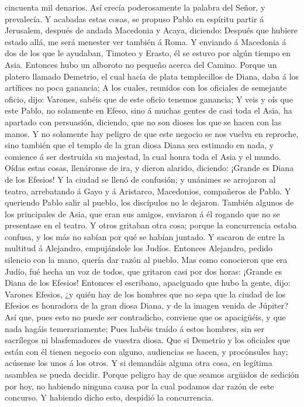 cincuenta mil denarios.  Así crecía poderosamente la
palabra del Señor, y prevalecía.  Y acabadas estas cosas,
se propuso Pablo en espíritu partir á Jerusalem, después de andada
Macedonia y Acaya, diciendo: Después que hubiere estado allá, me será
menester ver también á Roma.  Y enviando á Macedonia á dos
de los que le ayudaban, Timoteo y Erasto, él se estuvo por algún tiempo
en Asia.  Entonces hubo un alboroto no pequeño acerca del
Camino.  Porque un platero llamado Demetrio, el cual hacía
de plata templecillos de Diana, daba á los artífices no poca ganancia;
 A los cuales, reunidos con los oficiales de semejante
oficio, dijo: Varones, sabéis que de este oficio tenemos ganancia;
 Y veis y oís que este Pablo, no solamente en Efeso, sino á
muchas gentes de casi toda el Asia, ha apartado con persuasión,
diciendo, que no son dioses los que se hacen con las manos.
 Y no solamente hay peligro de que este negocio se nos
vuelva en reproche, sino también que el templo de la gran diosa Diana
sea estimado en nada, y comience á ser destruída su majestad, la cual
honra toda el Asia y el mundo.  Oídas estas cosas,
llenáronse de ira, y dieron alarido, diciendo: ¡Grande es Diana de los
Efesios!  Y la ciudad se llenó de confusión; y unánimes se
arrojaron al teatro, arrebatando á Gayo y á Aristarco, Macedonios,
compañeros de Pablo.  Y queriendo Pablo salir al pueblo,
los discípulos no le dejaron.  También algunos de los
principales de Asia, que eran sus amigos, enviaron á él rogando que no
se presentase en el teatro.  Y otros gritaban otra cosa;
porque la concurrencia estaba confusa, y los más no sabían por qué se
habían juntado.  Y sacaron de entre la multitud á
Alejandro, empujándole los Judíos. Entonces Alejandro, pedido silencio
con la mano, quería dar razón al pueblo.  Mas como
conocieron que era Judío, fué hecha un voz de todos, que gritaron casi
por dos horas: ¡Grande es Diana de los Efesios!  Entonces
el escribano, apaciguado que hubo la gente, dijo: Varones Efesios, ¿y
quién hay de los hombres que no sepa que la ciudad de los Efesios es
honradora de la gran diosa Diana, y de la imagen venida de Júpiter?
 Así que, pues esto no puede ser contradicho, conviene que
os apacigüéis, y que nada hagáis temerariamente;  Pues
habéis traído á estos hombres, sin ser sacrílegos ni blasfemadores de
vuestra diosa.  Que si Demetrio y los oficiales que están
con él tienen negocio con alguno, audiencias se hacen, y procónsules
hay; acúsense los unos á los otros.  Y si demandáis alguna
otra cosa, en legítima asamblea se pueda decidir.  Porque
peligro hay de que seamos argüidos de sedición por hoy, no habiendo
ninguna causa por la cual podamos dar razón de este concurso. Y habiendo
dicho esto, despidió la concurrencia. 


